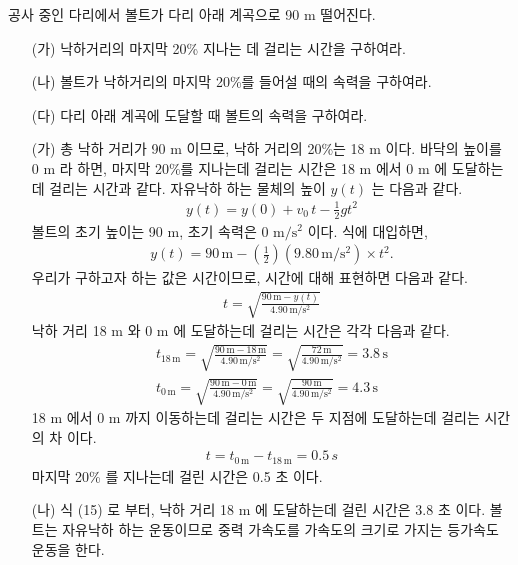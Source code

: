 \documentclass[APS,floatfix,nofootinbib,superscriptaddress,fleqn,preprint]{revtex4}
\begin{document}
\newpage

공사 중인 다리에서 볼트가 다리 아래 계곡으로 90 m 떨어진다.
\begin{itemize}
\item[(가)] 낙하거리의 마지막 20\% 지나는 데 걸리는 시간을 구하여라.
\item[(나)] 볼트가 낙하거리의 마지막 20\%를 들어설 때의 속력을
  구하여라.
\item[(다)] 다리 아래 계곡에 도달할 때 볼트의 속력을 구하여라.   
\end{itemize} 
\begin{itemize}
  \item[(가)] 총 낙하 거리가 90 m 이므로, 낙하 거리의 20\%는 18 m 이다. 
  바닥의 높이를 0 m 라 하면, 마지막 20\%를 지나는데 걸리는 시간은 18 m 에서 0 m 에 도달하는데 걸리는 시간과 같다.
  자유낙하 하는 물체의 높이 $y(t)$ 는 다음과 같다.
  \begin{align}
    y(t) = y(0) +v_0\,t-\frac{1}{2}gt^2
  \end{align}
  볼트의 초기 높이는 90 m, 초기 속력은 0 $\mathrm{m/s^2}$ 이다. 식에 대입하면,
  \begin{align}
    y(t) = 90\,\mathrm{m}-\left(\frac{1}{2}\right) (9.80\,\mathrm{m/s^2}) \times t^2.    
  \end{align}
  우리가 구하고자 하는 값은 시간이므로, 시간에 대해 표현하면 다음과 같다.
  \begin{align}
    t=\sqrt{\frac{90\,\mathrm{m}-y(t)}{4.90\,\mathrm{m/s^2}}}
  \end{align}
  낙하 거리 18 m 와 0 m 에 도달하는데 걸리는 시간은 각각 다음과 같다.
  \begin{align}
    t_{18\,\mathrm{m}}=\sqrt{\frac{90\,\mathrm{m}-18\,\mathrm{m}}{4.90\,\mathrm{m/s^2}}} = \sqrt{\frac{72\,\mathrm{m}}{4.90\,\mathrm{m/s^2}}}=3.8\,\mathrm{s} \\
    t_{0\,\mathrm{m}}=\sqrt{\frac{90\,\mathrm{m}-0\,\mathrm{m}}{4.90\,\mathrm{m/s^2}}} = \sqrt{\frac{90\,\mathrm{m}}{4.90\,\mathrm{m/s^2}}}=4.3\,\mathrm{s}
  \end{align}
  18 m 에서 0 m 까지 이동하는데 걸리는 시간은 두 지점에 도달하는데 걸리는 시간의 차 이다.
  \begin{align}
    t = t_{0\,\mathrm{m}}-t_{18\,\mathrm{m}}= 0.5\mathrm\,{s}
  \end{align}
  마지막 20\% 를 지나는데 걸린 시간은 0.5 초 이다.
  \item[(나)] 식 (15) 로 부터, 낙하 거리 18 m 에 도달하는데 걸린 시간은 3.8 초 이다. 
  볼트는 자유낙하 하는 운동이므로 중력 가속도를 가속도의 크기로 가지는 등가속도 운동을 한다.

\end{itemize}
\end{document}
